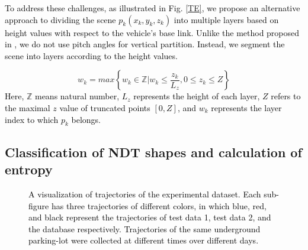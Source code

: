 \documentclass[letterpaper, 10 pt, conference]{ieeeconf}   %
\newcommand\kevin[1]{\textcolor{black}{#1}}
\begin{document}
\kevin{To address these challenges, as illustrated in Fig. \ref{TE}, we propose an alternative approach to dividing the scene $p_k(x_k, y_k, z_k)$ into multiple layers based on height values with respect to the vehicle's base link. Unlike the method proposed in \cite{wang2020lidar}, we do not use pitch angles for vertical partition. Instead, we  segment the scene into layers according to the height values.}

\begin{equation}
\label{zlayer}
    w_k=max\left\{{w_k} \in \mathbb{Z} | {w_k} \leq \frac{z_k}{L_z}, 0 \leq {z_k} \leq Z \right\}
\end{equation}
\kevin{Here, $\mathbb{Z}$ means natural number, $L_z$ represents the height of each layer, $Z$ refers to the maximal $z$ value of truncated points $[0, Z]$, and $w_k$ represents the layer index to which $p_k$ belongs. }

\subsection{Classification of NDT shapes and calculation of entropy}
\begin{figure}[t]
    \centering
    \caption{\kevin{A visualization of trajectories of the experimental dataset. Each sub-figure has three trajectories of different colors, in which blue, red, and black represent the trajectories of test data 1, test data 2, and the database respectively. Trajectories of the same underground parking-lot were collected at different times over different days.}}
    \label{dataset}
\end{figure}
\end{document}

